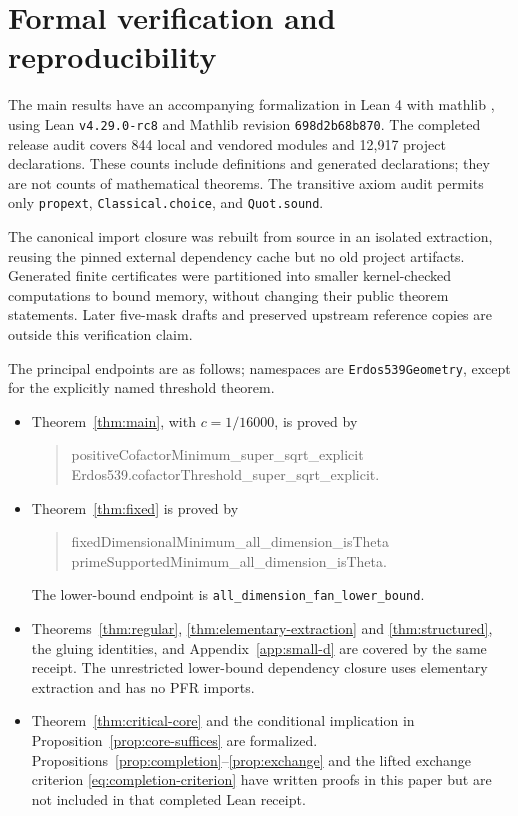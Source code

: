 \documentclass[11pt]{amsart}
\theoremstyle{definition}
\theoremstyle{remark}
\begin{document}
\section{Formal verification and reproducibility}\label{sec:formal}
The main results have an accompanying formalization \cite{Lean539} in Lean 4 \cite{Lean4} with mathlib \cite{Mathlib}, using Lean \texttt{v4.29.0-rc8} and Mathlib revision \texttt{698d2b68b870}. The completed release audit covers 844 local and vendored modules and 12,917 project declarations. These counts include definitions and generated declarations; they are not counts of mathematical theorems. The transitive axiom audit permits only \texttt{propext}, \texttt{Classical.choice}, and \texttt{Quot.sound}.

The canonical import closure was rebuilt from source in an isolated extraction, reusing the pinned external dependency cache but no old project artifacts. Generated finite certificates were partitioned into smaller kernel-checked computations to bound memory, without changing their public theorem statements. Later five-mask drafts and preserved upstream reference copies are outside this verification claim.

The principal endpoints are as follows; namespaces are \texttt{Erdos539Geometry}, except for the explicitly named threshold theorem.
\begin{itemize}
\item Theorem~\ref{thm:main}, with $c=1/16000$, is proved by
\begin{quote}\small\ttfamily
positiveCofactorMinimum\_super\_sqrt\_explicit\\
Erdos539.cofactorThreshold\_super\_sqrt\_explicit.
\end{quote}
\item Theorem~\ref{thm:fixed} is proved by
\begin{quote}\small\ttfamily
fixedDimensionalMinimum\_all\_dimension\_isTheta\\
primeSupportedMinimum\_all\_dimension\_isTheta.
\end{quote}
The lower-bound endpoint is \texttt{all\_dimension\_fan\_lower\_bound}.
\item Theorems~\ref{thm:regular}, \ref{thm:elementary-extraction} and \ref{thm:structured}, the gluing identities, and Appendix~\ref{app:small-d} are covered by the same receipt. The unrestricted lower-bound dependency closure uses elementary extraction and has no PFR imports.
\item Theorem~\ref{thm:critical-core} and the conditional implication in Proposition~\ref{prop:core-suffices} are formalized. Propositions~\ref{prop:completion}--\ref{prop:exchange} and the lifted exchange criterion \eqref{eq:completion-criterion} have written proofs in this paper but are not included in that completed Lean receipt.
\end{itemize}
\end{document}
